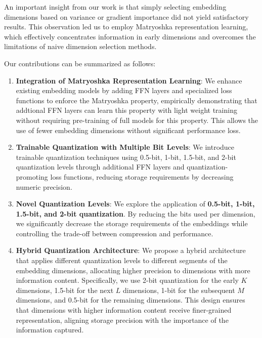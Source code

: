 \documentclass[acmtog, authorversion]{acmart}
\begin{document}
An important insight from our work is that simply selecting embedding dimensions based on variance or gradient importance did not yield satisfactory results. This observation led us to employ Matryoshka representation learning, which effectively concentrates information in early dimensions and overcomes the limitations of naive dimension selection methods.  
  
Our contributions can be summarized as follows:  
  
\begin{enumerate}  
    \item \textbf{Integration of Matryoshka Representation Learning}: We enhance existing embedding models by adding FFN layers and specialized loss functions to enforce the Matryoshka property, empirically demonstrating that addtional FFN layers can learn this property with light weight training without requiring pre-training of full models for this property. This allows the use of fewer embedding dimensions without significant performance loss.
  
    \item \textbf{Trainable Quantization with Multiple Bit Levels}: We introduce trainable quantization techniques using 0.5-bit, 1-bit, 1.5-bit, and 2-bit quantization levels through additional FFN layers and quantization-promoting loss functions, reducing storage requirements by decreasing numeric precision.  
  
    \item \textbf{Novel Quantization Levels}: We explore the application of \textbf{0.5-bit, 1-bit, 1.5-bit, and 2-bit quantization}. By reducing the bits used per dimension, we significantly decrease the storage requirements of the embeddings while controlling the trade-off between compression and performance.  
  
    \item \textbf{Hybrid Quantization Architecture}: We propose a hybrid architecture that applies different quantization levels to different segments of the embedding dimensions, allocating higher precision to dimensions with more information content. Specifically, we use 2-bit quantization for the early \( K \) dimensions, 1.5-bit for the next \( L \) dimensions, 1-bit for the subsequent \( M \) dimensions, and 0.5-bit for the remaining dimensions. This design ensures that dimensions with higher information content receive finer-grained representation, aligning storage precision with the importance of the information captured.
  

\end{enumerate}
\end{document}
